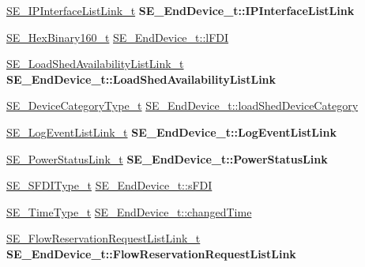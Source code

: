 \begin{DoxyCompactItemize}
\hyperlink{structSE__IPInterfaceListLink__t}{S\+E\+\_\+\+I\+P\+Interface\+List\+Link\+\_\+t} {\bfseries S\+E\+\_\+\+End\+Device\+\_\+t\+::\+I\+P\+Interface\+List\+Link}
\item 
\hyperlink{group__HexBinary160_ga92b92aa55555bdb75f3a59060f2c1632}{S\+E\+\_\+\+Hex\+Binary160\+\_\+t} \hyperlink{group__EndDevice_gafe27205146aef10dbda86b098b9fac01}{S\+E\+\_\+\+End\+Device\+\_\+t\+::l\+F\+DI}
\item 
\mbox{\label{group__EndDevice_ga3168662b0dae65ce770bec23970cd145}} 
\hyperlink{structSE__LoadShedAvailabilityListLink__t}{S\+E\+\_\+\+Load\+Shed\+Availability\+List\+Link\+\_\+t} {\bfseries S\+E\+\_\+\+End\+Device\+\_\+t\+::\+Load\+Shed\+Availability\+List\+Link}
\item 
\hyperlink{group__DeviceCategoryType_gafc136ae19a3dd5b2fd2265d848ddeb2f}{S\+E\+\_\+\+Device\+Category\+Type\+\_\+t} \hyperlink{group__EndDevice_ga3bf79be31f948539ab80cc7b0fc12930}{S\+E\+\_\+\+End\+Device\+\_\+t\+::load\+Shed\+Device\+Category}
\item 
\mbox{\label{group__EndDevice_ga61c754940a85006c74e648e51c012c68}} 
\hyperlink{structSE__LogEventListLink__t}{S\+E\+\_\+\+Log\+Event\+List\+Link\+\_\+t} {\bfseries S\+E\+\_\+\+End\+Device\+\_\+t\+::\+Log\+Event\+List\+Link}
\item 
\mbox{\label{group__EndDevice_ga7c1cd0f46c2268102e921315480d04dd}} 
\hyperlink{structSE__PowerStatusLink__t}{S\+E\+\_\+\+Power\+Status\+Link\+\_\+t} {\bfseries S\+E\+\_\+\+End\+Device\+\_\+t\+::\+Power\+Status\+Link}
\item 
\hyperlink{group__SFDIType_ga08ad209b3cfce51cbdc450d1d35a1045}{S\+E\+\_\+\+S\+F\+D\+I\+Type\+\_\+t} \hyperlink{group__EndDevice_ga710ce8285a63cf5f3b269ed0f2d92511}{S\+E\+\_\+\+End\+Device\+\_\+t\+::s\+F\+DI}
\item 
\hyperlink{group__TimeType_ga6fba87a5b57829b4ff3f0e7638156682}{S\+E\+\_\+\+Time\+Type\+\_\+t} \hyperlink{group__EndDevice_ga909dabe84c9c37177ec7a63776c0170f}{S\+E\+\_\+\+End\+Device\+\_\+t\+::changed\+Time}
\item 
\mbox{\label{group__EndDevice_ga09e77e31b39e20ed97bd44e31e6489b2}} 
\hyperlink{structSE__FlowReservationRequestListLink__t}{S\+E\+\_\+\+Flow\+Reservation\+Request\+List\+Link\+\_\+t} {\bfseries S\+E\+\_\+\+End\+Device\+\_\+t\+::\+Flow\+Reservation\+Request\+List\+Link}

\end{DoxyCompactItemize}
